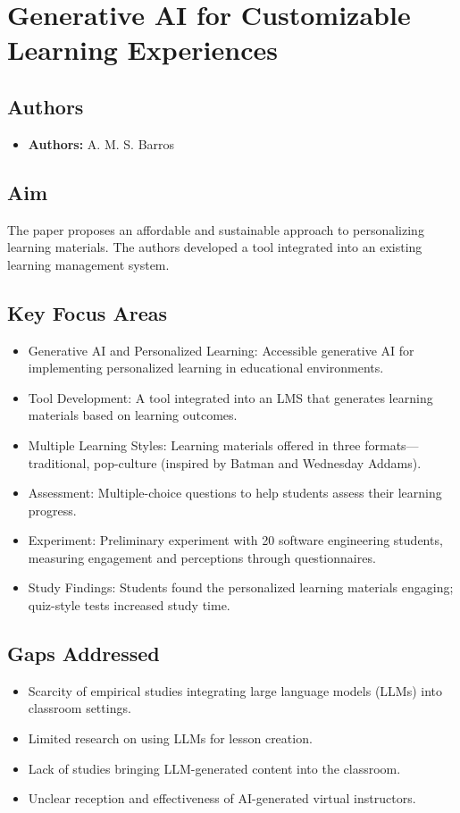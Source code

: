 \section{Generative AI for Customizable Learning Experiences}

\subsection{Authors}
\begin{itemize}
    \item \textbf{Authors:} A. M. S. Barros
\end{itemize}
    

\subsection{Aim}
The paper proposes an affordable and sustainable approach to personalizing learning materials. The authors developed a tool integrated into an existing learning management system.

\subsection{Key Focus Areas}
\begin{itemize}
    \item Generative AI and Personalized Learning: Accessible generative AI for implementing personalized learning in educational environments.
    \item Tool Development: A tool integrated into an LMS that generates learning materials based on learning outcomes.
    \item Multiple Learning Styles: Learning materials offered in three formats—traditional, pop-culture (inspired by Batman and Wednesday Addams).
    \item Assessment: Multiple-choice questions to help students assess their learning progress.
    \item Experiment: Preliminary experiment with 20 software engineering students, measuring engagement and perceptions through questionnaires.
    \item Study Findings: Students found the personalized learning materials engaging; quiz-style tests increased study time.
\end{itemize}

\subsection{Gaps Addressed}
\begin{itemize}
    \item Scarcity of empirical studies integrating large language models (LLMs) into classroom settings.
    \item Limited research on using LLMs for lesson creation.
    \item Lack of studies bringing LLM-generated content into the classroom.
    \item Unclear reception and effectiveness of AI-generated virtual instructors.
\end{itemize}
